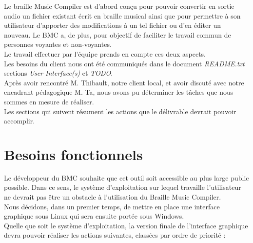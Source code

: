 
Le braille Music Compiler est d'abord conçu pour pouvoir convertir en sortie audio un fichier existant écrit en braille musical ainsi que pour permettre à son utilisateur d'apporter des modifications à un tel fichier ou d'en éditer un nouveau. Le BMC a, de plus, pour objectif de faciliter le travail commun de personnes voyantes et non-voyantes.\\
Le travail effectuer par l'équipe prends en compte ces deux aspects.\\

Les besoins du client nous ont été communiqués dans le document \textit{README.txt} sections \textit{User Interface(s)} et \textit{TODO}.\\
Après avoir rencontré M. Thibault, notre client local, et avoir discuté avec notre encadrant pédagogique M. Ta, nous avons pu déterminer les tâches que nous sommes en mesure de réaliser. \\

Les sections qui suivent résument les actions que le délivrable devrait pouvoir accomplir.


\section{Besoins fonctionnels}
Le développeur du BMC souhaite que cet outil soit accessible au plus large public possible. Dans ce sens, le système d'exploitation sur lequel travaille l'utilisateur ne devrait pas être un obstacle à l'utilisation du Braille Music Compiler.\\

Nous décidons, dans un premier temps, de mettre en place une interface graphique sous Linux qui sera ensuite portée sous Windows.\\
 
Quelle que soit le système d'exploitation, la version finale de l'interface graphique devra pouvoir réaliser les actions suivantes, classées par ordre de priorité : \\

